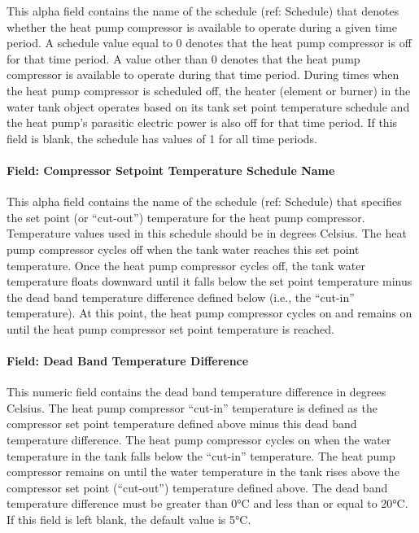 This alpha field contains the name of the schedule (ref: Schedule) that denotes whether the heat pump compressor is available to operate during a given time period. A schedule value equal to 0 denotes that the heat pump compressor is off for that time period. A value other than 0 denotes that the heat pump compressor is available to operate during that time period. During times when the heat pump compressor is scheduled off, the heater (element or burner) in the water tank object operates based on its tank set point temperature schedule and the heat pump's parasitic electric power is also off for that time period. If this field is blank, the schedule has values of 1 for all time periods.

\paragraph{Field: Compressor Setpoint Temperature Schedule Name}\label{field-compressor-setpoint-temperature-schedule-name}

This alpha field contains the name of the schedule (ref: Schedule) that specifies the set point (or ``cut-out'') temperature for the heat pump compressor. Temperature values used in this schedule should be in degrees Celsius. The heat pump compressor cycles off when the tank water reaches this set point temperature. Once the heat pump compressor cycles off, the tank water temperature floats downward until it falls below the set point temperature minus the dead band temperature difference defined below (i.e., the ``cut-in'' temperature). At this point, the heat pump compressor cycles on and remains on until the heat pump compressor set point temperature is reached.

\paragraph{Field: Dead Band Temperature Difference}\label{field-dead-band-temperature-difference-000}

This numeric field contains the dead band temperature difference in degrees Celsius. The heat pump compressor ``cut-in'' temperature is defined as the compressor set point temperature defined above minus this dead band temperature difference. The heat pump compressor cycles on when the water temperature in the tank falls below the ``cut-in'' temperature. The heat pump compressor remains on until the water temperature in the tank rises above the compressor set point (``cut-out'') temperature defined above. The dead band temperature difference must be greater than 0°C and less than or equal to 20°C. If this field is left blank, the default value is 5°C.

